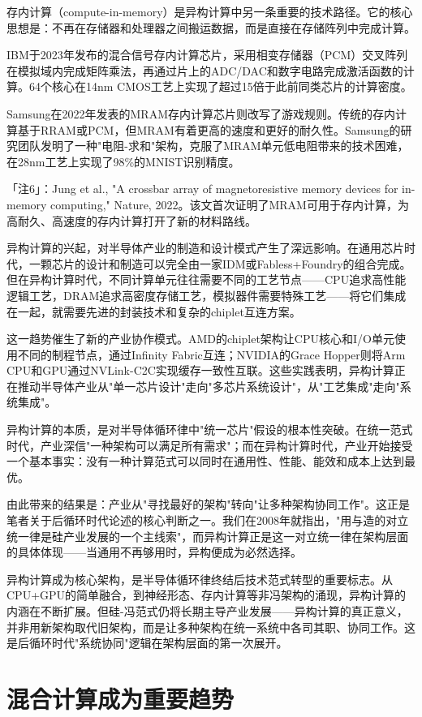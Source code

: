 \documentclass[11pt,a4paper]{article}
\begin{document}
存内计算（compute-in-memory）是异构计算中另一条重要的技术路径。它的核心思想是：不再在存储器和处理器之间搬运数据，而是直接在存储阵列中完成计算。

IBM于2023年发布的混合信号存内计算芯片，采用相变存储器（PCM）交叉阵列在模拟域内完成矩阵乘法，再通过片上的ADC/DAC和数字电路完成激活函数的计算。64个核心在14nm CMOS工艺上实现了超过15倍于此前同类芯片的计算密度。

Samsung在2022年发表的MRAM存内计算芯片则改写了游戏规则。传统的存内计算基于RRAM或PCM，但MRAM有着更高的速度和更好的耐久性。Samsung的研究团队发明了一种"电阻-求和"架构，克服了MRAM单元低电阻带来的技术困难，在28nm工艺上实现了98\%的MNIST识别精度。

「注6」：Jung et al., "A crossbar array of magnetoresistive memory devices for in-memory computing," Nature, 2022。该文首次证明了MRAM可用于存内计算，为高耐久、高速度的存内计算打开了新的材料路线。

异构计算的兴起，对半导体产业的制造和设计模式产生了深远影响。在通用芯片时代，一颗芯片的设计和制造可以完全由一家IDM或Fabless+Foundry的组合完成。但在异构计算时代，不同计算单元往往需要不同的工艺节点——CPU追求高性能逻辑工艺，DRAM追求高密度存储工艺，模拟器件需要特殊工艺——将它们集成在一起，就需要先进的封装技术和复杂的chiplet互连方案。

这一趋势催生了新的产业协作模式。AMD的chiplet架构让CPU核心和I/O单元使用不同的制程节点，通过Infinity Fabric互连；NVIDIA的Grace Hopper则将Arm CPU和GPU通过NVLink-C2C实现缓存一致性互联。这些实践表明，异构计算正在推动半导体产业从"单一芯片设计"走向"多芯片系统设计"，从"工艺集成"走向"系统集成"。

异构计算的本质，是对半导体循环律中"统一芯片"假设的根本性突破。在统一范式时代，产业深信"一种架构可以满足所有需求"；而在异构计算时代，产业开始接受一个基本事实：没有一种计算范式可以同时在通用性、性能、能效和成本上达到最优。

由此带来的结果是：产业从"寻找最好的架构"转向"让多种架构协同工作"。这正是笔者关于后循环时代论述的核心判断之一。我们在2008年就指出，"用与造的对立统一律是硅产业发展的一个主线索"，而异构计算正是这一对立统一律在架构层面的具体体现——当通用不再够用时，异构便成为必然选择。

异构计算成为核心架构，是半导体循环律终结后技术范式转型的重要标志。从CPU+GPU的简单融合，到神经形态、存内计算等非冯架构的涌现，异构计算的内涵在不断扩展。但硅-冯范式仍将长期主导产业发展——异构计算的真正意义，并非用新架构取代旧架构，而是让多种架构在统一系统中各司其职、协同工作。这是后循环时代"系统协同"逻辑在架构层面的第一次展开。

\section{混合计算成为重要趋势}
\end{document}

